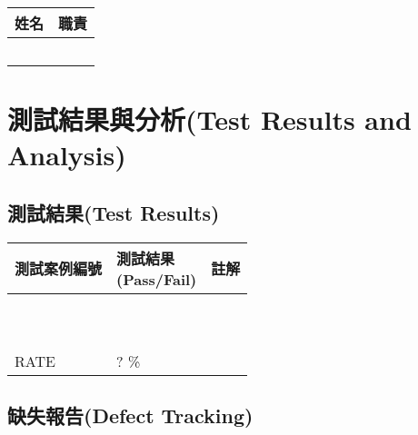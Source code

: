 \documentclass{article}
\begin{document}
\begin{tabularx}{0.4\textwidth}{| X | X |}
	\hline
	姓名 & 職責 \\ \hline
	   &    \\ \hline
	   &    \\ \hline
	   &    \\ \hline
	   &    \\ \hline
	   &    \\ \hline
\end{tabularx}

\newpage

\section[測試結果與分析(TEST RESULTS AND ANALYSIS)]{測試結果與分析(Test Results and Analysis)}

\subsection[測試結果(TEST RESULTS)]{測試結果(Test Results)}

\begin{tabularx}{\textwidth}{| m{} | m{} | X |}
	\rowcolor{LightGray}
	\hline
	測試案例編號 & \makecell{測試結果   \\ (Pass/Fail)} & 註解 \\ \hline
	       &                & \\ \hline
	       &                & \\ \hline
	       &                & \\ \hline
	       &                & \\ \hline
	       &                & \\ \hline
	       &                & \\ \hline
	       &                & \\ \hline
	       &                & \\ \hline
	       &                & \\ \hline
	       &                & \\ \hline
	\rowcolor{LightGray}
	RATE   & ? \%           & \\ \hline
\end{tabularx}

\subsection[缺失報告(DEFECT TRACKING)]{缺失報告(Defect Tracking)}
\end{document}
